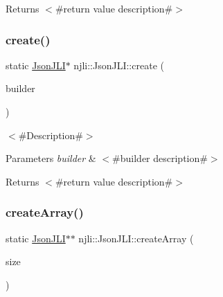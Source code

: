 \begin{DoxyReturn}{Returns}
$<$\#return value description\#$>$ 
\end{DoxyReturn}
\mbox{\label{classnjli_1_1_json_j_l_i_a639dee21b688252f5e570cf46ad63713}} 
\subsubsection{\texorpdfstring{create()}{create()}\hspace{0.1cm}{\footnotesize\ttfamily [3/3]}}
{\footnotesize\ttfamily static \mbox{\hyperlink{classnjli_1_1_json_j_l_i}{Json\+J\+LI}}$\ast$ njli\+::\+Json\+J\+L\+I\+::create (\begin{DoxyParamCaption}\item[{const \mbox{\hyperlink{classnjli_1_1_json_j_l_i_builder}{Json\+J\+L\+I\+Builder}} \&}]{builder }\end{DoxyParamCaption})\hspace{0.3cm}{\ttfamily [static]}}

$<$\#\+Description\#$>$


\begin{DoxyParams}{Parameters}
{\em builder} & $<$\#builder description\#$>$\\
\hline
\end{DoxyParams}
\begin{DoxyReturn}{Returns}
$<$\#return value description\#$>$ 
\end{DoxyReturn}
\mbox{\label{classnjli_1_1_json_j_l_i_a4bb33dba5db29b43b5f98fd406ca83a4}} 
\subsubsection{\texorpdfstring{create\+Array()}{createArray()}}
{\footnotesize\ttfamily static \mbox{\hyperlink{classnjli_1_1_json_j_l_i}{Json\+J\+LI}}$\ast$$\ast$ njli\+::\+Json\+J\+L\+I\+::create\+Array (\begin{DoxyParamCaption}\item[{const \mbox{\hyperlink{_util_8h_a10e94b422ef0c20dcdec20d31a1f5049}{u32}}}]{size }\end{DoxyParamCaption})\hspace{0.3cm}{\ttfamily [static]}}

